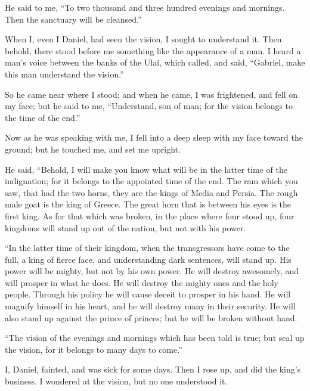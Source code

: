 {\par }{\PP {}He said to me, “To two thousand and three hundred evenings and mornings. Then the sanctuary will be cleansed.”
\par }{\PP {}When I, even I Daniel, had seen the vision, I sought to understand it. Then behold, there stood before me something like the appearance of a man.
I heard a man’s voice between the banks of the Ulai, which called, and said, “Gabriel, make this man understand the vision.”
\par }{\PP {}So he came near where I stood; and when he came, I was frightened, and fell on my face; but he said to me, “Understand, son of man; for the vision belongs to the time of the end.”
\par }{\PP {}Now as he was speaking with me, I fell into a deep sleep with my face toward the ground; but he touched me, and set me upright.
\par }{\PP {}He said, “Behold, I will make you know what will be in the latter time of the indignation; for it belongs to the appointed time of the end.
The ram which you saw, that had the two horns, they are the kings of Media and Persia.
The rough male goat is the king of Greece. The great horn that is between his eyes is the first king.
As for that which was broken, in the place where four stood up, four kingdoms will stand up out of the nation, but not with his power.
\par }{\PP {}“In the latter time of their kingdom, when the transgressors have come to the full, a king of fierce face, and understanding dark sentences, will stand up.
His power will be mighty, but not by his own power. He will destroy awesomely, and will prosper in what he does. He will destroy the mighty ones and the holy people.
Through his policy he will cause deceit to prosper in his hand. He will magnify himself in his heart, and he will destroy many in their security. He will also stand up against the prince of princes; but he will be broken without hand.
\par }{\PP {}“The vision of the evenings and mornings which has been told is true; but seal up the vision, for it belongs to many days to come.”
\par }{\PP {}I, Daniel, fainted, and was sick for some days. Then I rose up, and did the king’s business. I wondered at the vision, but no one understood it.

}
